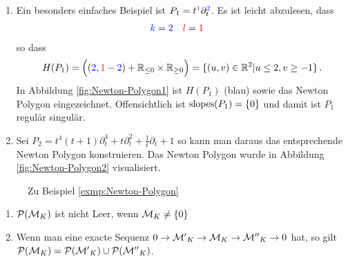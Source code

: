 \begin{exmp} \label{exmp:Newton-Polygon}
\begin{enumerate}
\item Ein besonders einfaches Beispiel ist 
$P_1=t^{\textcolor{red}1}\partial_t^{\textcolor{blue}2}$.  Es ist leicht
abzulesen, dass
\begin{align*}
\textcolor{blue}k &= \textcolor{blue}2 & 
\textcolor{red}l  &= \textcolor{red}1
\end{align*}
so dass
\[
H(P_1)=\Big( (\textcolor{blue}{2},\textcolor{red}{1}-\textcolor{blue}{2}) +
\mathbb{R}_{\leq 0}\times \mathbb{R}_{\geq 0} \Big) =\{(u,v)\in\mathbb{R}^2|u\leq 2, v\geq -1\} \,.
\]
In Abbildung \ref{fig:Newton-Polygon1} ist $H(P_1)$ (blau) sowie das Newton
Polygon eingezeichnet. Offensichtlich ist $\operatorname{slopes}(P_1)=\{0\}$ und damit ist
$P_1$ regulär singulär.
\item \cite[Bsp 5.3. 2.]{ZulaBarbara}
Sei $P_2=t^4(t+1)\partial_t^4+t\partial_t^2+\frac{1}{t}\partial_t+1$ so kann
man daraus das entsprechende Newton Polygon konstruieren.
Das Newton Polygon wurde in Abbildung \ref{fig:Newton-Polygon2} visualisiert.
\end{enumerate}
\end{exmp}
\begin{figure}[H]
\label{fig:Newton-Polygon}
\caption{Zu Beispiel \ref{exmp:Newton-Polygon}}
\centering
\end{figure}

\begin{lem}
\cite[5.1]{sabbah_cimpa90} %
\begin{enumerate}
\item $\mathcal{P}(\mathcal{M}_K)$ ist nicht Leer, wenn $\mathcal{M}_K\neq\{0\}$
\item Wenn man eine exacte Sequenz
$0\rightarrow{\ensuremath \mathcal{M}'}_K\rightarrow{\ensuremath \mathcal{M}}_K\rightarrow{\ensuremath \mathcal{M}''}_K\rightarrow0$
hat, so gilt $\mathcal{P}(\mathcal{M}_K)=\mathcal{P}({\mathcal{M}'}_K)\cup\mathcal{P}({\mathcal{M}''}_K)$.
\end{enumerate}
\end{lem}

